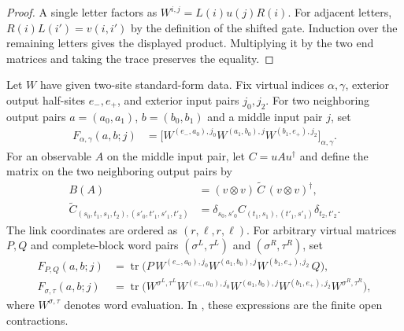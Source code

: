 \begin{proof}\leanok
    A single letter factors as $W^{i,j}=L(i)u(j)R(i)$. For adjacent
    letters, $R(i)L(i')=v(i,i')$ by the definition of the shifted gate.
    Induction over the remaining letters gives the displayed product.
    Multiplying it by the two end matrices and taking the trace preserves
    the equality.
\end{proof}

\begin{definition}
    \label{def:mpu_two_site_open_three_block}
    \leanok
    Let $W$ have given two-site standard-form data. Fix virtual indices
    $\alpha,\gamma$, exterior output half-sites $e_-,e_+$, and exterior
    input pairs $j_0,j_2$. For two neighboring output pairs
    $a=(a_0,a_1)$, $b=(b_0,b_1)$ and a middle input pair $j$, set
    \begin{align}
        F_{\alpha,\gamma}(a,b;j)
         & =\bigl[W^{(e_-,a_0),j_0}
            W^{(a_1,b_0),j}W^{(b_1,e_+),j_2}\bigr]_{\alpha,\gamma}.
    \end{align}
    For an observable $A$ on the middle input pair, let
    $C=uAu^{\dagger}$ and define the matrix on the two neighboring output
    pairs by
    \begin{align}
        B(A) & =(v\otimes v)\,\widetilde C\,(v\otimes v)^{\dagger}, \\
        \widetilde C_{(s_0,t_1,s_1,t_2),(s'_0,t'_1,s'_1,t'_2)}
             & =\delta_{s_0,s'_0}
        C_{(t_1,s_1),(t'_1,s'_1)}\delta_{t_2,t'_2}.
    \end{align}
    The link coordinates are ordered as $(r,\ell,r,\ell)$. For arbitrary
    virtual matrices $P,Q$ and complete-block word pairs
    $(\sigma^{L},\tau^{L})$ and $(\sigma^{R},\tau^{R})$, set
    \begin{align}
        F_{P,Q}(a,b;j)
         & =\operatorname{tr}\bigl(P\,W^{(e_-,a_0),j_0}
        W^{(a_1,b_0),j}W^{(b_1,e_+),j_2}\,Q\bigr),         \\
        F_{\sigma,\tau}(a,b;j)
         & =\operatorname{tr}\bigl(W^{\sigma^{L},\tau^{L}}
        W^{(e_-,a_0),j_0}W^{(a_1,b_0),j}W^{(b_1,e_+),j_2}
        W^{\sigma^{R},\tau^{R}}\bigr),
    \end{align}
    where $W^{\sigma,\tau}$ denotes word evaluation. In \cite[Equations~\texttt{uuvv} and \texttt{StandardForm}]{Cirac2017MPU}, these expressions are the finite
    open
    contractions.
\end{definition}

